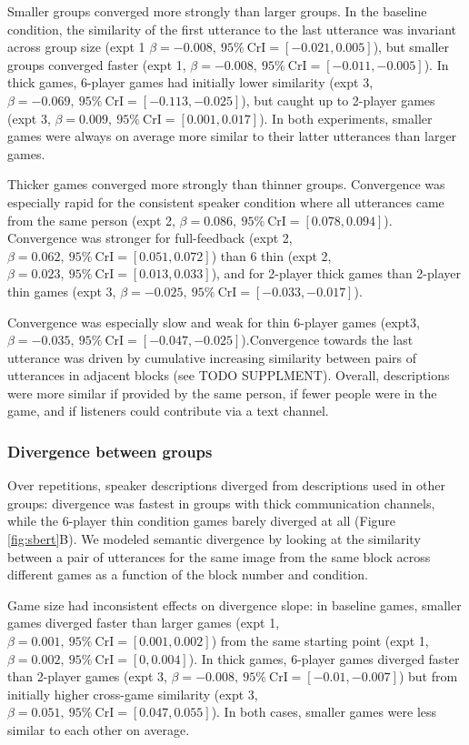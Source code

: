 \documentclass[
  english,
  a4paper,
]{article}
\begin{document}
Smaller groups converged more strongly than larger groups. In the baseline condition, the similarity of the first utterance to the last utterance was invariant across group size (expt 1 \(\beta=-0.008,\:95\%\:\mathrm{CrI}=[-0.021, 0.005]\)), but smaller groups converged faster (expt 1, \(\beta=-0.008,\:95\%\:\mathrm{CrI}=[-0.011, -0.005]\)). In thick games, 6-player games had initially lower similarity (expt 3, \(\beta=-0.069,\:95\%\:\mathrm{CrI}=[-0.113, -0.025]\)), but caught up to 2-player games (expt 3, \(\beta=0.009,\:95\%\:\mathrm{CrI}=[0.001, 0.017]\)). In both experiments, smaller games were always on average more similar to their latter utterances than larger games.

Thicker games converged more strongly than thinner groups. Convergence was especially rapid for the consistent speaker condition where all utterances came from the same person (expt 2, \(\beta=0.086,\:95\%\:\mathrm{CrI}=[0.078, 0.094]\)). Convergence was stronger for full-feedback (expt 2, \(\beta=0.062,\:95\%\:\mathrm{CrI}=[0.051, 0.072]\)) than 6 thin (expt 2, \(\beta=0.023,\:95\%\:\mathrm{CrI}=[0.013, 0.033]\)), and for 2-player thick games than 2-player thin games (expt 3, \(\beta=-0.025,\:95\%\:\mathrm{CrI}=[-0.033, -0.017]\)).

Convergence was especially slow and weak for thin 6-player games (expt3, \(\beta=-0.035,\:95\%\:\mathrm{CrI}=[-0.047, -0.025]\)).Convergence towards the last utterance was driven by cumulative increasing similarity between pairs of utterances in adjacent blocks (see TODO SUPPLMENT). Overall, descriptions were more similar if provided by the same person, if fewer people were in the game, and if listeners could contribute via a text channel.

\hypertarget{divergence-between-groups}{%
\subsubsection{Divergence between groups}\label{divergence-between-groups}}

Over repetitions, speaker descriptions diverged from descriptions used in other groups: divergence was fastest in groups with thick communication channels, while the 6-player thin condition games barely diverged at all (Figure \ref{fig:sbert}B). We modeled semantic divergence by looking at the similarity between a pair of utterances for the same image from the same block across different games as a function of the block number and condition.

Game size had inconsistent effects on divergence slope: in baseline games, smaller games diverged faster than larger games (expt 1,\(\beta=0.001,\:95\%\:\mathrm{CrI}=[0.001, 0.002]\)) from the same starting point (expt 1, \(\beta=0.002,\:95\%\:\mathrm{CrI}=[0, 0.004]\)). In thick games, 6-player games diverged faster than 2-player games (expt 3, \(\beta=-0.008,\:95\%\:\mathrm{CrI}=[-0.01, -0.007]\)) but from initially higher cross-game similarity (expt 3, \(\beta=0.051,\:95\%\:\mathrm{CrI}=[0.047, 0.055]\)). In both cases, smaller games were less similar to each other on average.
\end{document}
